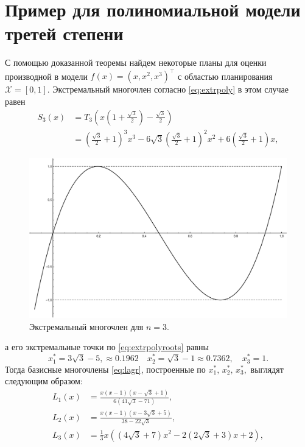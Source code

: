 \documentclass[specialist,
               substylefile = spbu.rtx,
               subf,href,colorlinks=true, 12pt]{disser}
\theoremstyle{definition}
\begin{document}
	\section{Пример для полиномиальной модели третей степени}
	\label{sec:ex}
	С помощью доказанной теоремы найдем некоторые планы для оценки производной в модели $f(x)  = (x, x^2, x^3)^\top$ с областью планирования $\mathcal{X} = [0, 1]$. Экстремальный многочлен согласно \eqref{eq:extrpoly} в этом случае равен 
	\begin{align*}
		S_3(x) &= T_3\left(x \left(1 + \frac{\sqrt{3}}{2} \right) -  \frac{\sqrt{3}}{2} \right) \\ 
		&= \left(\frac{\sqrt{3}}{2}+1\right)^3 x^3-6 \sqrt{3} \left(\frac{\sqrt{3}}{2}+1\right)^2 x^2+6 \left(\frac{\sqrt{3}}{2}+1\right) x,
	\end{align*}
	\begin{figure}
		\includegraphics[width=\textwidth]{fig/s3.pdf}
		\caption{Экстремальный многочлен для $n = 3$.}
	\end{figure}
	а его экстремальные точки по \eqref{eq:extrpolyroots} равны 
	\begin{equation}
	\label{eq:ex:point}
		x_1^* = 3 \sqrt{3} - 5, \approx 0.1962 \quad x_2^* = \sqrt{3} - 1 \approx 0.7362, \quad x_3^* = 1.
	\end{equation}
	Тогда базисные многочлены \eqref{eq:lagr}, построенные по $x_1^*, \,x_2^*, \,x_3^*,$  выглядят следующим образом:
	\begin{align*}
		L_1(x) &= \frac{x (x - 1) (x - \sqrt{3} + 1)}{6 (41 \sqrt{3} - 71)}, \\
		L_2(x) &= \frac{x (x - 1) \left(x-3 \sqrt{3}+5\right)}{38 - 22 \sqrt{3}},\\
		L_3(x) &= \frac{1}{3} x \left(\left(4 \sqrt{3}+7\right) x^2-2 \left(2 \sqrt{3}+3\right) x+2\right) ,
	\end{align*}
\end{document}
